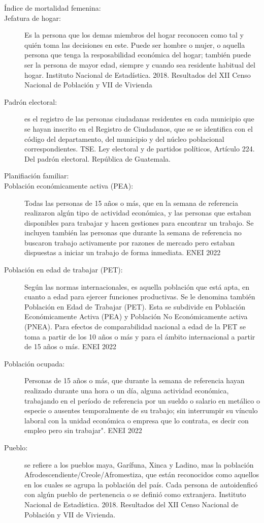 \begin{description}
	\item[Índice de mortalidad femenina:] 
	\item[Jefatura de hogar:] Es la persona que los demas miembros del hogar reconocen como tal y quién toma las decisiones en este. Puede ser hombre o mujer, o aquella persona que tenga la resposabilidad económica del hogar; también puede ser la persona de mayor edad, siempre y cuando sea residente habitual del hogar. Instituto Nacional de Estadística. 2018. Resultados del XII Censo Nacional de Población y VII de Vivienda
	\item[Padrón electoral:]  es el registro de las personas ciudadanas residentes en cada municipio que se hayan inscrito en el Registro de Ciudadanos, que se se identifica con el código del departamento, del municipio y del núcleo poblacional correspondientes. TSE. Ley electoral y de partidos políticos, Artículo 224. Del padrón electoral. República de Guatemala.
	\item[Planifiación familiar:] 
	\item[Población económicamente activa (PEA):] Todas las personas de 15 años o más, que en la semana de referencia realizaron algún tipo de actividad económica, y las personas que estaban disponibles para trabajar y hacen gestiones para encontrar un trabajo. Se incluyen también las personas que durante la semana de referencia no buscaron trabajo activamente por razones de mercado pero estaban dispuestas a iniciar un trabajo de forma inmediata. ENEI 2022
	\item[Población en edad de trabajar (PET):] Según las normas internacionales, es aquella población que está apta, en cuanto a edad para ejercer funciones productivas. Se le denomina también Población en Edad de Trabajar (PET). Esta se subdivide en Población Económicamente Activa (PEA) y Población No Económicamente activa (PNEA). Para efectos de comparabilidad nacional a edad de la PET se toma a partir de los 10 años o más y para el ámbito internacional a partir de 15 años o más. ENEI 2022
	\item[Población ocupada:] Personas de 15 años o más, que durante la semana de referencia hayan realizado durante una hora o un día, alguna actividad económica, trabajando en el período de referencia por un sueldo o salario en metálico o especie o ausentes temporalmente de su trabajo; sin interrumpir su vínculo laboral con la unidad económica o empresa que lo contrata, es decir con empleo pero sin trabajar". ENEI 2022
	\item[Pueblo:] se refiere a los pueblos maya, Garífuna, Xinca y Ladino, mas la población Afrodescendiente/Creole/Afromestiza, que están reconocidos como aquellos en los cuales se agrupa la población del país. Cada persona de autoidenficó con algún pueblo de pertenencia o se definió como extranjera. Instituto Nacional de Estadística. 2018. Resultados del XII Censo Nacional de Población y VII de Vivienda.

\end{description}
